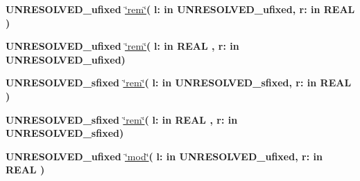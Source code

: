 \begin{DoxyCompactItemize}
\item 
{\bfseries {\bfseries \textcolor{vhdlchar}{U\+N\+R\+E\+S\+O\+L\+V\+E\+D\+\_\+ufixed}\textcolor{vhdlchar}{ }}} \hyperlink{class__fixed__pkg_a66a380593306e6133903e7a5cb03056a}{\char`\"{}rem\char`\"{}}{\bfseries  ( }{\bfseries \textcolor{vhdlchar}{l\+: }\textcolor{stringliteral}{in }\textcolor{vhdlchar}{U\+N\+R\+E\+S\+O\+L\+V\+E\+D\+\_\+ufixed}}{\bfseries  , \textcolor{vhdlchar}{r\+: }\textcolor{stringliteral}{in }{\bfseries \textcolor{comment}{R\+E\+A\+L}\textcolor{vhdlchar}{ }}}{\bfseries  )} 
\item 
{\bfseries {\bfseries \textcolor{vhdlchar}{U\+N\+R\+E\+S\+O\+L\+V\+E\+D\+\_\+ufixed}\textcolor{vhdlchar}{ }}} \hyperlink{class__fixed__pkg_a66a380593306e6133903e7a5cb03056a}{\char`\"{}rem\char`\"{}}{\bfseries  ( }{\bfseries \textcolor{vhdlchar}{l\+: }\textcolor{stringliteral}{in }{\bfseries \textcolor{comment}{R\+E\+A\+L}\textcolor{vhdlchar}{ }}}{\bfseries  , \textcolor{vhdlchar}{r\+: }\textcolor{stringliteral}{in }\textcolor{vhdlchar}{U\+N\+R\+E\+S\+O\+L\+V\+E\+D\+\_\+ufixed}}{\bfseries  )} 
\item 
{\bfseries {\bfseries \textcolor{vhdlchar}{U\+N\+R\+E\+S\+O\+L\+V\+E\+D\+\_\+sfixed}\textcolor{vhdlchar}{ }}} \hyperlink{class__fixed__pkg_ac069740ccb193c395e563f253d734127}{\char`\"{}rem\char`\"{}}{\bfseries  ( }{\bfseries \textcolor{vhdlchar}{l\+: }\textcolor{stringliteral}{in }\textcolor{vhdlchar}{U\+N\+R\+E\+S\+O\+L\+V\+E\+D\+\_\+sfixed}}{\bfseries  , \textcolor{vhdlchar}{r\+: }\textcolor{stringliteral}{in }{\bfseries \textcolor{comment}{R\+E\+A\+L}\textcolor{vhdlchar}{ }}}{\bfseries  )} 
\item 
{\bfseries {\bfseries \textcolor{vhdlchar}{U\+N\+R\+E\+S\+O\+L\+V\+E\+D\+\_\+sfixed}\textcolor{vhdlchar}{ }}} \hyperlink{class__fixed__pkg_ac069740ccb193c395e563f253d734127}{\char`\"{}rem\char`\"{}}{\bfseries  ( }{\bfseries \textcolor{vhdlchar}{l\+: }\textcolor{stringliteral}{in }{\bfseries \textcolor{comment}{R\+E\+A\+L}\textcolor{vhdlchar}{ }}}{\bfseries  , \textcolor{vhdlchar}{r\+: }\textcolor{stringliteral}{in }\textcolor{vhdlchar}{U\+N\+R\+E\+S\+O\+L\+V\+E\+D\+\_\+sfixed}}{\bfseries  )} 
\item 
{\bfseries {\bfseries \textcolor{vhdlchar}{U\+N\+R\+E\+S\+O\+L\+V\+E\+D\+\_\+ufixed}\textcolor{vhdlchar}{ }}} \hyperlink{class__fixed__pkg_adcb31bd19e000188752c17ad006b956d}{\char`\"{}mod\char`\"{}}{\bfseries  ( }{\bfseries \textcolor{vhdlchar}{l\+: }\textcolor{stringliteral}{in }\textcolor{vhdlchar}{U\+N\+R\+E\+S\+O\+L\+V\+E\+D\+\_\+ufixed}}{\bfseries  , \textcolor{vhdlchar}{r\+: }\textcolor{stringliteral}{in }{\bfseries \textcolor{comment}{R\+E\+A\+L}\textcolor{vhdlchar}{ }}}{\bfseries  )} 

\end{DoxyCompactItemize}
